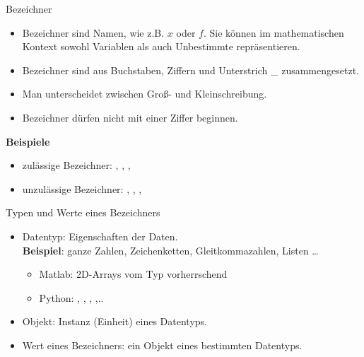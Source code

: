 \documentclass[hyperref={xetex}]{beamer}
\begin{document}
\begin{frame}[fragile]{Bezeichner}
\begin{itemize}
\item \alert{Bezeichner} sind Namen, wie z.B. $x$ oder $f$. Sie können
im mathematischen Kontext sowohl Variablen als auch Unbestimmte repräsentieren.
\item Bezeichner sind aus Buchstaben, Ziffern und
Unterstrich \_ zusammengesetzt.
\item Man unterscheidet zwischen Groß- und Kleinschreibung.
\item Bezeichner dürfen nicht mit einer Ziffer beginnen.
\end{itemize}
\textbf{Beispiele}
\begin{itemize}
\item zulässige Bezeichner:
, , , 
\item unzulässige Bezeichner:
, , , 
\end{itemize}
\end{frame}

\begin{frame}[fragile]{Typen und Werte eines Bezeichners}
\begin{itemize}
\item \alert{Datentyp}: Eigenschaften der Daten. \\
  \textbf{Beispiel}: ganze Zahlen, Zeichenketten, Gleitkommazahlen, Listen  \ldots  
  \begin{itemize}
    \item Matlab: 2D-Arrays vom Typ  vorherrschend
    \item Python: , , , ,..
  \end{itemize}
\item \alert{Objekt}: Instanz (Einheit) eines Datentyps.
\item \alert{Wert} eines Bezeichners: ein \alert{Objekt} eines bestimmten
\alert{Datentyps}.
\end{itemize}
\end{frame}
\end{document}
